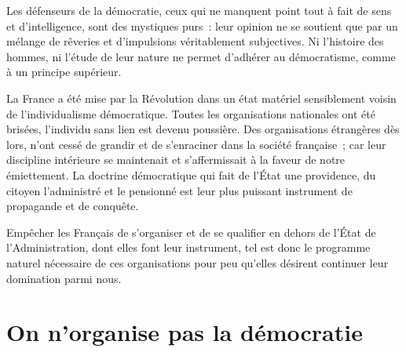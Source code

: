 \documentclass[french,twoside]{book} %
\newcommand{\astermono}{\medskip\centerline{\color{rubric}\large\selectfont{\syms ✻}}\medskip\par}%
\begin{document}
\astermono

\noindent Les défenseurs de la démocratie, ceux qui ne manquent point tout à fait de sens et d’intelligence, sont des mystiques purs : leur opinion ne se soutient que par un mélange de rêveries et d’impulsions véritablement subjectives. Ni l’histoire des hommes, ni l’étude de leur nature ne permet d’adhérer au démocratisme, comme à un principe supérieur.\par
La France a été mise par la Révolution dans un état matériel sensiblement voisin de l’individualisme démocratique. Toutes les organisations nationales ont été brisées, l’individu sans lien est devenu poussière. Des organisations étrangères dès lors, n’ont cessé de grandir et de s’enraciner dans la société française ; car leur discipline intérieure se maintenait et s’affermissait à la faveur de notre émiettement. La doctrine démocratique qui fait de l’État une providence, du citoyen l’administré et le pensionné est leur plus puissant instrument de propagande et de conquête.\par
Empêcher les Français de s’organiser et de se qualifier en dehors de l’État de l’Administration, dont elles font leur instrument, tel est donc le programme naturel nécessaire de ces organisations pour peu qu’elles désirent continuer leur domination parmi nous.
\section[{On n’organise pas la démocratie}]{On n’organise pas la démocratie}
\end{document}
